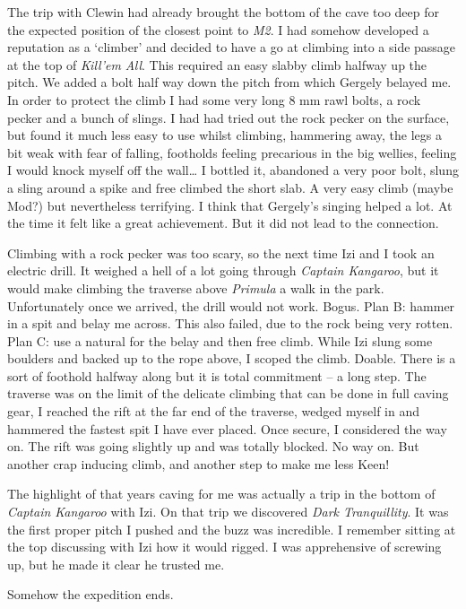 The trip with Clewin had already brought the bottom of the cave too deep
for the expected position of the closest point to \emph{M2}. I had
somehow developed a reputation as a `climber' and decided to have a go
at climbing into a side passage at the top of \emph{Kill'em All}. This
required an easy slabby climb halfway up the pitch. We added a bolt half
way down the pitch from which Gergely belayed me. In order to protect
the climb I had some very long 8 mm rawl bolts, a rock pecker and a
bunch of slings. I had had tried out the rock pecker on the surface, but
found it much less easy to use whilst climbing, hammering away, the legs
a bit weak with fear of falling, footholds feeling precarious in the big
wellies, feeling I would knock myself off the wall\ldots{} I bottled it,
abandoned a very poor bolt, slung a sling around a spike and free
climbed the short slab. A very easy climb (maybe Mod?) but nevertheless
terrifying. I think that Gergely's singing helped a lot. At the time it
felt like a great achievement. But it did not lead to the connection.

Climbing with a rock pecker was too scary, so the next time Izi and I
took an electric drill. It weighed a hell of a lot going through
\emph{Captain Kangaroo}, but it would make climbing the traverse above
\emph{Primula} a walk in the park. Unfortunately once we arrived, the
drill would not work. Bogus. Plan B: hammer in a spit and belay me
across. This also failed, due to the rock being very rotten. Plan C: use
a natural for the belay and then free climb. While Izi slung some
boulders and backed up to the rope above, I scoped the climb. Doable.
There is a sort of foothold halfway along but it is total commitment --
a long step. The traverse was on the limit of the delicate climbing that
can be done in full caving gear, I reached the rift at the far end of
the traverse, wedged myself in and hammered the fastest spit I have ever
placed. Once secure, I considered the way on. The rift was going
slightly up and was totally blocked. No way on. But another crap
inducing climb, and another step to make me less Keen!

The highlight of that years caving for me was actually a trip in the
bottom of \emph{Captain Kangaroo} with Izi. On that trip we discovered
\emph{Dark Tranquillity}. It was the first proper pitch I pushed and the
buzz was incredible. I remember sitting at the top discussing with Izi
how it would rigged. I was apprehensive of screwing up, but he made it
clear he trusted me.

Somehow the expedition ends.


